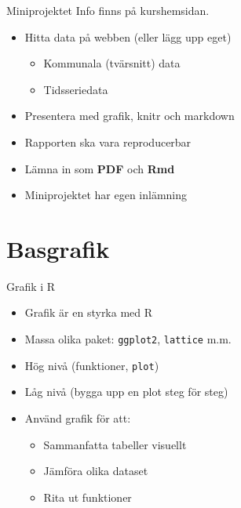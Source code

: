 \documentclass[
  11pt,
  ignorenonframetext,
  handout]{beamer}
\providecommand{\tightlist}{%
  \setlength{\itemsep}{0pt}\setlength{\parskip}{0pt}}
\newcommand\imp[1]{\alert{\textbf{#1}}}
\begin{document}
\begin{frame}{Miniprojektet}
\protect{}\label{miniprojektet}
Info finns på kurshemsidan.

\begin{itemize}
\tightlist
\item
  Hitta data på webben (eller lägg upp eget)

  \begin{itemize}
  \tightlist
  \item
    Kommunala (tvärsnitt) data
  \item
    Tidsseriedata
  \end{itemize}
\item
  Presentera med grafik, knitr och markdown
\item
  Rapporten ska vara reproducerbar
\item
  Lämna in som \imp{PDF} och \imp{Rmd}
\item
  Miniprojektet har egen inlämning
\end{itemize}
\end{frame}

\section{Basgrafik}\label{basgrafik}

\begin{frame}{Grafik i R}
\protect{}\label{grafik-i-r}
\begin{itemize}
\tightlist
\item
  Grafik är en styrka med R
\item
  Massa olika paket: \texttt{ggplot2}, \texttt{lattice} m.m.
\item
  Hög nivå (funktioner, \texttt{plot})
\item
  Låg nivå (bygga upp en plot steg för steg)
\item
  Använd grafik för att:

  \begin{itemize}
  \tightlist
  \item
    Sammanfatta tabeller visuellt
  \item
    Jämföra olika dataset
  \item
    Rita ut funktioner
  \end{itemize}
\end{itemize}
\end{frame}
\end{document}
